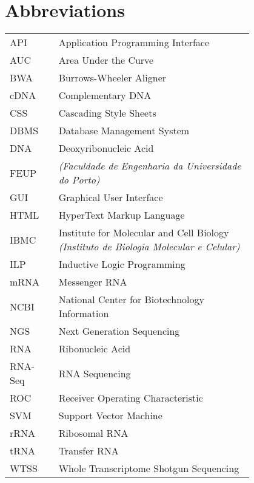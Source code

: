 \chapter*{Abbreviations}

\begin{flushleft}
\begin{tabular}{l p{0.8\linewidth}}
API       & Application Programming Interface\\
AUC       & Area Under the Curve\\
BWA       & Burrows-Wheeler Aligner\\
cDNA      & Complementary DNA\\
CSS       & Cascading Style Sheets\\
DBMS      & Database Management System\\
DNA       & Deoxyribonucleic Acid\\
FEUP      & \Feup{} \textit{(Faculdade de Engenharia da Universidade do Porto)}\\
GUI       & Graphical User Interface\\
HTML      & HyperText Markup Language\\
IBMC      & Institute for Molecular and Cell Biology \textit{(Instituto de Biologia Molecular e Celular)}\\
ILP       & Inductive Logic Programming\\
mRNA      & Messenger RNA\\
NCBI      & National Center for Biotechnology Information\\
NGS       & Next Generation Sequencing\\
RNA       & Ribonucleic Acid\\
RNA-Seq   & RNA Sequencing\\
ROC       & Receiver Operating Characteristic\\
SVM       & Support Vector Machine\\
rRNA      & Ribosomal RNA\\
tRNA      & Transfer RNA\\
WTSS      & Whole Transcriptome Shotgun Sequencing\\
\end{tabular}
\end{flushleft}

